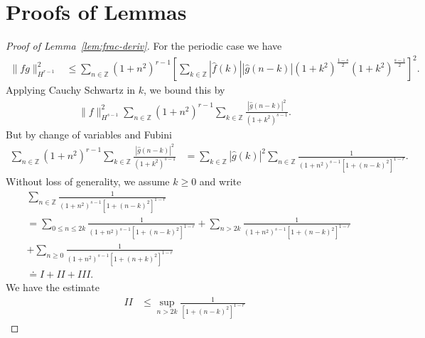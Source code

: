 \documentclass[12pt,reqno]{amsart}
\numberwithin{equation}{section}  %
\numberwithin{figure}{section}
\newcommand{\zz}{\mathbb{Z}}
\newcommand{\wh}{\widehat}
\begin{document}
\section{Proofs of Lemmas} 
\label{sec:pf-lemmas}
%
%
%
\begin{proof}[Proof of Lemma~\ref{lem:frac-deriv}]
For the periodic case we have
%
%
\begin{equation*}
\begin{split}
\| fg\|_{H^{r-1}}^{2}
& \le  \sum_{n \in \zz}  (1 + n^{2})^{r-1}\left [ \sum_{k \in \zz}
| \wh{f}(k) |  | \wh{g}(n - k) | (1 +
k^{2})^{\frac{1-s}{2}} (1 + k^{2})^{\frac{s-1}{2}}
\right ]^{2}.
\end{split}
\end{equation*}
%
Applying Cauchy Schwartz in $k$, we bound this by
%
%
%
\begin{equation*}
\label{np-key-term}
\begin{split}
\| f \|_{H^{s-1}}^{2} \sum_{n \in \zz}  (1 + n^{2})^{r-1}\sum_{k \in \zz} \frac{|
\wh{g}(n - k) |^{2}}{(1 + k^{2})^{s-1}}.
\end{split}
\end{equation*}
%
But by change of variables and Fubini
%
\begin{equation}
\label{opp}
\begin{split}
\sum_{n \in \zz}  (1 + n^{2})^{r-1}\sum_{k \in \zz} \frac{|
\wh{g}(n - k) |^{2}}{(1 + k^{2})^{s-1}}
& = \sum_{k \in \zz}| \wh{g}(k) |^{2} \sum_{n \in \zz}  
\frac{1}{(1 + n^{2})^{s-1}[1 + (n - k)^{2}]^{1-r}}.  
\end{split}
\end{equation}
%
Without loss of generality, we assume $k \ge 0$ and write 
\begin{equation*}
\begin{split}
&  \sum_{n \in \zz}  
\frac{1}{(1 + n^{2})^{s-1}[1 + (n - k)^{2}]^{1-r}}  
\\
& = 
\sum_{0 \le n \le 2k} \frac{1}{(1 + n^{2})^{s-1}[1 + (n - k)^{2}]^{1-r}} 
+ \sum_{n > 2k} \frac{1}{(1 + n^{2})^{s-1}[1 + (n - k)^{2}]^{1-r}}
\\
& + \sum_{n \ge 0} \frac{1}{(1 + n^{2})^{s-1}[1 + (n + k)^{2}]^{1-r}} 
\\
& \doteq I + II + III.
\end{split} 
\end{equation*}
%
We have the estimate
%
%
\begin{equation}
\label{est-tem}
\begin{split}
II 
& \le \sup_{n > 2k} \frac{1}{\left[ 1 + (n-k)^{2} \right]^{1-r}}

\end{split}
\end{equation}
\end{proof}
\end{document}
